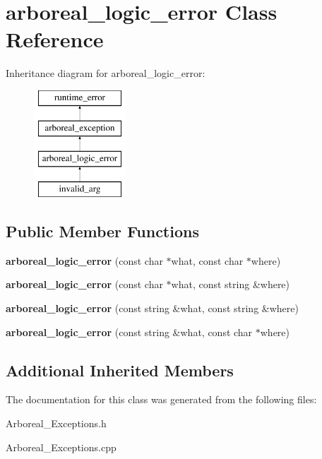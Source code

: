 \hypertarget{classarboreal__logic__error}{}\section{arboreal\+\_\+logic\+\_\+error Class Reference}
\label{classarboreal__logic__error}
Inheritance diagram for arboreal\+\_\+logic\+\_\+error\+:\begin{figure}[H]
\begin{center}
\leavevmode
\includegraphics[height=4.000000cm]{classarboreal__logic__error}
\end{center}
\end{figure}
\subsection*{Public Member Functions}
\begin{DoxyCompactItemize}
\item 
\mbox{\label{classarboreal__logic__error_a47d03ca013f1bc3aaa28742fbecfa2f5}} 
{\bfseries arboreal\+\_\+logic\+\_\+error} (const char $\ast$what, const char $\ast$where)
\item 
\mbox{\label{classarboreal__logic__error_aedf21d3b0681a88498a4f3228a432d28}} 
{\bfseries arboreal\+\_\+logic\+\_\+error} (const char $\ast$what, const string \&where)
\item 
\mbox{\label{classarboreal__logic__error_a4568e1449ea4de577509ccf0df3a8632}} 
{\bfseries arboreal\+\_\+logic\+\_\+error} (const string \&what, const string \&where)
\item 
\mbox{\label{classarboreal__logic__error_a7096d545fbc92feae25553602ef4fc6a}} 
{\bfseries arboreal\+\_\+logic\+\_\+error} (const string \&what, const char $\ast$where)
\end{DoxyCompactItemize}
\subsection*{Additional Inherited Members}


The documentation for this class was generated from the following files\+:\begin{DoxyCompactItemize}
\item 
Arboreal\+\_\+\+Exceptions.\+h\item 
Arboreal\+\_\+\+Exceptions.\+cpp\end{DoxyCompactItemize}
